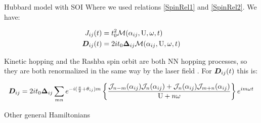 \begin{section}{Hubbard model with SOI}
Where we used relations \ref{SpinRel1} and \ref{SpinRel2}. We have:

\begin{align}
J_{ij}(t) &= t_0^2\mathcal{M}(\alpha_{ij}, \text{U}, \omega, t) \label{JijHSOI} \\
\boldsymbol{D}_{ij}(t) &= 2it_0\boldsymbol{\Delta}_{ij} \mathcal{M}(\alpha_{ij}, \text{U}, \omega, t) \label{DijHSOI}
\end{align}

Kinetic hopping and the Rashba spin orbit are both NN hopping processes, so they are both renormalized in the same way by the laser field \cite{Stepanov2017}.
For $\boldsymbol{D}_{ij}(t)$ this is:

\begin{equation}
\boldsymbol{D}_{ij} = 2it_0 \boldsymbol{\Delta}_{ij} \sum_{mn}e^{-i(\frac{\pi}{2}+\theta_{ij})m} \left\{ 
    \frac{\mathcal{J}_{n-m}(\alpha_{ij})\mathcal{J}_{n}(\alpha_{ij}) + \mathcal{J}_{n}(\alpha_{ij})\mathcal{J}_{m+n}(\alpha_{ij})}{\text{U}+n\omega} \right\}e^{im\omega t}
\end{equation}

\end{section}



\begin{section}{Other general Hamiltonians}
\label{SectionOtherHams}


\end{section}

